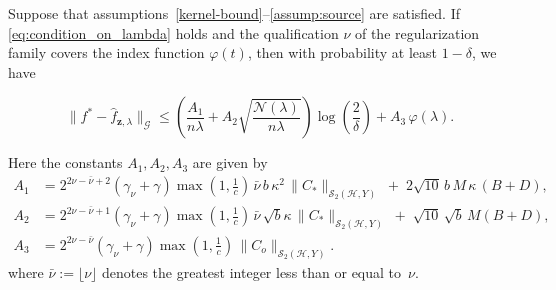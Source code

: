 \documentclass[twoside,11pt]{article}
\begin{document}
\begin{theorem}\label{vrkhs:theorem:proof}
Suppose that {assumptions~\ref{kernel-bound}--\ref{assump:source}} are satisfied.
If \eqref{eq:condition_on_lambda} holds and the qualification $\nu$ of the regularization family covers the index function \(\varphi(t)\),
then with probability at least \(1-\delta\), we have

\[
\big\|f^*-\widehat{f}_{\textbf{z},\lambda}\big\|_{\mathcal G}\leq \left(
\frac{A_1}{n\lambda}
+ A_2\sqrt{\frac{\mathcal{N}(\lambda)}{n\lambda}}
\right) \log\left(\frac{2}{\delta}\right)
+ A_3\,\varphi(\lambda).
\]

\noindent
Here the constants $A_1,A_2,A_3$ are given by 
\begin{align*}
A_1
&= 2^{2\nu- \bar \nu+2}(\gamma_\nu+\gamma)\max\!\left(1,\frac{1}{c}\right)
\,\bar \nu\, b\,\kappa^{2}\,\|C_{*}\|_{\mathcal S_2(\mathcal H,Y)}
\;+\; 2\sqrt{10}\,b\,M\,\kappa\,(B+D), \\[6pt]
A_2
&= 2^{2\nu- \bar \nu+1}(\gamma_\nu+\gamma)\max\!\left(1,\frac{1}{c}\right)
\, \bar \nu\, \sqrt{b}\kappa\,\|C_{*}\|_{\mathcal S_2(\mathcal H,Y)}
\;+\; \sqrt{10}\,\sqrt{b}\,M(B+D), \\[6pt]
A_3
&= 2^{2\nu- \bar \nu}(\gamma_\nu+\gamma)\max\!\left(1,\frac{1}{c}\right)
\,\|C_{o}\|_{\mathcal S_2(\mathcal H,Y)}.
\end{align*}
where $\bar{\nu} := \lfloor \nu  \rfloor$ denotes the greatest integer
less than or equal to~$\nu $.
\end{theorem}
\end{document}
